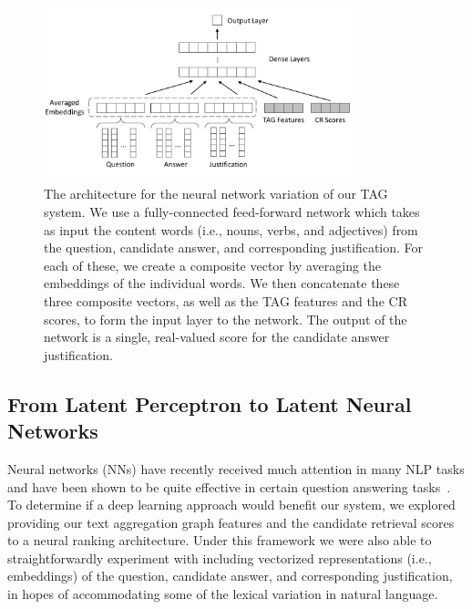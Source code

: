 {\begin{figure}
\centering
\includegraphics[width=0.8\textwidth]{tagNNArch2scores.pdf}
\caption{The architecture for the neural network variation of our TAG system. We use a fully-connected feed-forward network which takes as input the content words (i.e., nouns, verbs, and adjectives) from the question, candidate answer, and corresponding justification.  For each of these, we create a composite vector by averaging the embeddings of the individual words.  We then concatenate these three composite vectors, as well as the TAG features and the CR scores, to form the input layer to the network. The output of the network is a single, real-valued score for the candidate answer justification.}
\label{fig:nn_arch}
\end{figure}

\subsection{From Latent Perceptron to Latent Neural Networks}
\label{sec:nn}

Neural networks (NNs) have recently received much attention in many NLP tasks and have been shown to be quite effective in certain question answering tasks~\cite{Iyyer2014,bordes2014question,bordes2015large,Iyyer2015,wang2015long,dong2015question,yih2015semantic,he2016pairwise,suggu2016deep}.  To determine if a deep learning approach would benefit our system, we explored providing our text aggregation graph features and the candidate retrieval scores to a neural ranking architecture.  Under this framework we were also able to straightforwardly experiment with including vectorized representations (i.e., embeddings) of the question, candidate answer, and corresponding justification, in hopes of accommodating some of the lexical variation in natural language.

}
